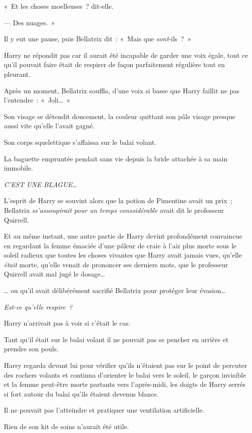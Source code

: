 «~Et les choses moelleuses~? dit-elle.

--- Des nuages.~»

Il y eut une pause, puis Bellatrix dit~: «~Mais que \emph{sont}-ils~?~»

Harry ne répondit pas car il aurait été incapable de garder une voix égale, tout ce qu'il pouvait faire était de respirer de façon parfaitement régulière tout en pleurant.

Après un moment, Bellatrix souffla, d'une voix si basse que Harry faillit ne pas l'entendre~: «~Joli…~»

Son visage se détendit doucement, la couleur quittant son pâle visage presque aussi vite qu'elle l'avait gagné.

Son corps squelettique s'affaissa sur le balai volant.

La baguette empruntée pendait sans vie depuis la bride attachée à sa main immobile.

\emph{C'EST UNE BLAGUE…}

L'esprit de Harry se souvint alors que la potion de Pimentine avait un prix~; Bellatrix \emph{ss'assoupirait pour un temps conssidérable} avait dit le professeur Quirrell.

Et au même instant, une autre partie de Harry devint profondément convaincue en regardant la femme émaciée d'une pâleur de craie à l'air plus morte sous le soleil radieux que toutes les choses vivantes que Harry avait jamais vues, qu'elle \emph{était} morte, qu'elle venait de prononcer ses derniers mots, que le professeur Quirrell avait mal jugé le dosage…

… ou qu'il avait délibérément sacrifié Bellatrix pour protéger leur évasion…

\emph{Est-ce qu'elle respire~?}

Harry n'arrivait pas à voir si c'était le cas.

Tant qu'il était sur le balai volant il ne pouvait pas se pencher en arrière et prendre son pouls.

Harry regarda devant lui pour vérifier qu'ils n'étaient pas sur le point de percuter des rochers volants et continua d'orienter le balai vers le soleil, le garçon invisible et la femme peut-être morte partants vers l'après-midi, les doigts de Harry serrés si fort autour du balai qu'ils étaient devenus blancs.

Il ne pouvait pas l'atteindre et pratiquer une ventilation artificielle.

Rien de son kit de soins n'aurait été utile.


